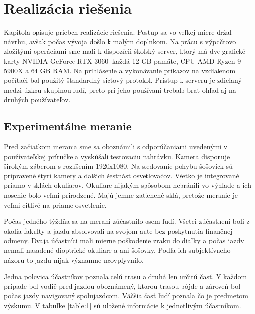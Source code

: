 \chapter{Realizácia riešenia}\label{chap:research}

Kapitola opísuje priebeh realizácie riešenia. Postup sa vo veľkej miere držal návrhu, avšak počas vývoja došlo k malým doplnkom. Na prácu s výpočtovo zložitými operáciami sme mali k dispozícii školský server, ktorý má dve grafické karty NVIDIA GeForce RTX 3060, každá 12 GB pamäte, CPU AMD Ryzen 9 5900X a 64 GB RAM. Na prihlásenie a vykonávanie príkazov na vzdialenom počítači bol použitý štandardný sieťový protokol. Prístup k serveru je zdieľaný medzi úzkou skupinou ľudí, preto pri jeho používaní trebalo brať ohľad aj na druhých používateľov.

\section{Experimentálne meranie}

Pred začiatkom merania sme sa oboznámili s odporúčaniami uvedenými v používateľskej príručke a vyskúšali testovaciu nahrávku. Kamera disponuje širokým záberom s rozlíšením 1920x1080. Na sledovanie pohybu šošoviek sú pripravené štyri kamery a ďalších šestnásť osvetľovačov. Všetko je integrované priamo v sklách okuliarov. Okuliare nijakým spôsobom nebránili vo výhľade a ich nosenie bolo veľmi prirodzené. Majú jemne zatienené sklá, pretože meranie je veľmi citlivé na priame osvetlenie.

Počas jedného týždňa sa na meraní zúčastnilo osem ľudí. Všetci zúčastnení boli z okolia fakulty a jazdu absolvovali na svojom aute bez poskytnutia finančnej odmeny. Dvaja účastníci mali mierne poškodenie zraku do diaľky a počas jazdy nemali nasadené dioptrické okuliare a ani šošovky. Podľa ich subjektívneho názoru to jazdu nijak významne neovplyvnilo.

Jedna polovica účastníkov poznala celú trasu a druhá len určitú časť. V každom prípade bol vodič pred jazdou oboznámený, ktorou trasou pôjde a zároveň bol počas jazdy navigovaný spolujazdcom. Väčšia časť ľudí poznala čo je predmetom výskumu. V tabuľke \ref{table:1} sú uložené informácie k jednotlivým účastníkom.

